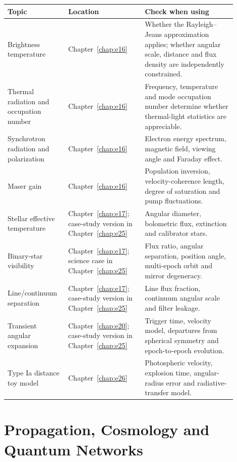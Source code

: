\begin{longtable}{p{0.22\linewidth}p{0.31\linewidth}p{0.37\linewidth}}
\toprule
Topic & Location & Check when using \\
\midrule
Brightness temperature & Chapter~\ref{chap:e16} & Whether the Rayleigh--Jeans approximation applies; whether angular scale, distance and flux density are independently constrained. \\
Thermal radiation and occupation number & Chapter~\ref{chap:e16} & Frequency, temperature and mode occupation number determine whether thermal-light statistics are appreciable. \\
Synchrotron radiation and polarization & Chapter~\ref{chap:e16} & Electron energy spectrum, magnetic field, viewing angle and Faraday effect. \\
Maser gain & Chapter~\ref{chap:e16} & Population inversion, velocity-coherence length, degree of saturation and pump fluctuations. \\
Stellar effective temperature & Chapter~\ref{chap:e17}; case-study version in Chapter~\ref{chap:e25} & Angular diameter, bolometric flux, extinction and calibrator stars. \\
Binary-star visibility & Chapter~\ref{chap:e17}; science case in Chapter~\ref{chap:e25} & Flux ratio, angular separation, position angle, multi-epoch orbit and mirror degeneracy. \\
Line/continuum separation & Chapter~\ref{chap:e17}; case-study version in Chapter~\ref{chap:e25} & Line flux fraction, continuum angular scale and filter leakage. \\
Transient angular expansion & Chapter~\ref{chap:e20}; case-study version in Chapter~\ref{chap:e25} & Trigger time, velocity model, departures from spherical symmetry and epoch-to-epoch evolution. \\
Type Ia distance toy model & Chapter~\ref{chap:e26} & Photospheric velocity, explosion time, angular-radius error and radiative-transfer model. \\
\bottomrule
\end{longtable}

\section{Propagation, Cosmology and Quantum Networks}
\label{appsec:a-propagation-network}

